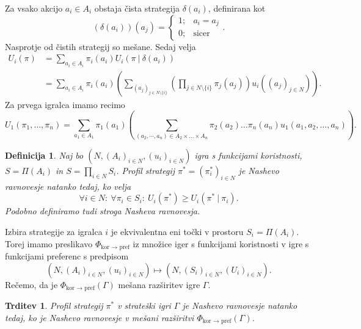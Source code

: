 \documentclass[10pt, a4paper]{article}
\newtheorem{trditev}[izr]{Trditev}
\newtheorem{defi}[izr]{Definicija}
\newenvironment{noticeB}{%
  \tcolorbox[%
  notitle,
  empty,
  enhanced,  %
  breakable,
  coltext=black,
  colback=white, 
  fontupper=\rmfamily,
  noparskip,
  sharp corners,
  boxrule=-1pt,  %
  frame hidden,
  left=7pt,  %
  right=7pt,
  top=5pt,
  bottom=5pt,
  before skip=2.5ex plus 2pt,
  after skip=2.5ex plus 2pt,
  borderline west = {1.5pt}{-0.1pt}{blue!30!black}, %
  overlay unbroken and last={%
    \draw[color=black, line width=1.25pt]
    ($(frame.south west)+(1.pt, -0.1pt)$) -- ++(2em, 0);
  }
  ]}
{\endtcolorbox}
\newenvironment{definicija}{\begin{noticeB}\begin{defi}}{%
    \end{defi}\end{noticeB}}
\begin{document}
Za vsako akcijo $a_i \in A_i$ obstaja čista strategija $\delta(a_i)$, definirana kot 
$$\left(\delta(a_i)\right) (a_j) = \begin{cases}
  1; & a_i = a_j\\
  0; & \textrm{sicer}
\end{cases}.$$
Nasprotje od čistih strategij so mešane. Sedaj velja 
\begin{align*}
  U_i (\pi) &= \sum_{a_i \in A_i} \pi_i (a_i) U_i(\pi\ \big|\ \delta (a_i))\\
  &= \sum_{a_i \in A_i} \pi_i (a_i) \left(\sum_{(a_j)_{j \in N\setminus \{i\}}} \left(\prod_{j \in N \setminus \{i\}} \pi_j (a_j)\right) u_i((a_j)_{j \in N})\right).
\end{align*}
Za prvega igralca imamo recimo
$$U_1 (\pi_1, \dots, \pi_n) = \sum_{a_1 \in A_1} \pi_1 (a_1) \left(\sum_{(a_2, \cdots, a_n) \in A_2 \times \dots \times A_n} \pi_2 (a_2) \dots \pi_n (a_n) u_1 (a_1, a_2, \dots, a_n)\right).$$
\begin{definicija}
  Naj bo $(N, (A_i)_{i \in N}, (u_i)_{i \in N})$ igra s funkcijami koristnosti, 
  $S = \Pi (A_i)$ in $S = \prod_{i \in N} S_i$.
  Profil strategij $\pi^* = (\pi^* _i)_{i \in N}$ je Nashevo ravnovesje natanko tedaj,
  ko velja 
  $$\forall i \in N:\ \forall \pi_i \in S_i:\ U_i (\pi^*) \geq U_i (\pi^*\ |\ \pi_i).$$
  Podobno definiramo tudi stroga Nasheva ravnovesja.
\end{definicija}

Izbira strategije za igralca $i$ je ekvivalentna eni točki v prostoru $S_i = \Pi(A_i)$.
Torej imamo preslikavo $\Phi_{\text{kor $\to$ pref}}$ iz množice iger s funkcijami koristnosti v igre s funkcijami preferenc s predpisom 
$$(N, (A_i)_{i \in N}, (u_i)_{i \in N}) \mapsto (N, (S_i)_{i \in N}, (U_i)_{i \in N}).$$
Rečemo, da je $\Phi_{\text{kor $\to$ pref}} (\Gamma)$ mešana razširitev igre $\Gamma$.

\begin{trditev}
  Profil strategij $\pi^*$ v strateški igri $\Gamma$ je Nashevo ravnovesje natanko tedaj,
  ko je Nashevo ravnovesje v mešani razširitvi $\Phi_{\text{kor $\to$ pref}} (\Gamma)$.
\end{trditev}
\end{document}
